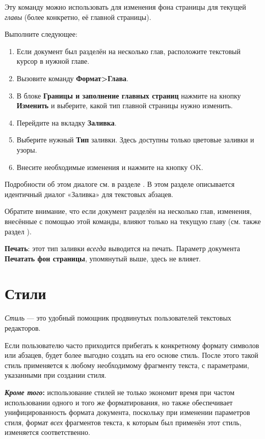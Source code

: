 ﻿\documentclass[a4paper,10pt]{article}
\begin{document}
Эту команду можно использовать для изменения фона страницы для текущей \textit{главы} (более конкретно, её главной страницы).

Выполните следующее:
\begin{enumerate}
 \item Если документ был разделён на несколько глав, расположите текстовый курсор в нужной главе.
 \item Вызовите команду \textbf{Формат>Глава}.
 \item В блоке \textbf{Границы и заполнение главных страниц} нажмите на кнопку \textbf{Изменить} и выберите, какой тип главной страницы нужно изменить.
 \item Перейдите на вкладку \textbf{Заливка}.
 \item Выберите нужный \textbf{Тип} заливки. Здесь доступны только цветовые заливки и узоры.
 \item Внесите необходимые изменения и нажмите на кнопку OK.
\end{enumerate}

Подробности об этом диалоге см. в разделе . В этом разделе описывается идентичный диалог «Заливка» для текстовых абзацев.

Обратите внимание, что если документ разделён на несколько глав, изменения, внесённые с помощью этой команды, влияют только на текущую главу (см. также раздел ).

\textbf{Печать}: этот тип заливки \textit{всегда} выводится на печать. Параметр документа \textbf{Печатать фон страницы}, упомянутый выше, здесь не влияет.

\section{Стили} \label{sec:стили}
\textit{Стиль} — это удобный помощник продвинутых пользователей текстовых редакторов.

Если пользователю часто приходится прибегать к конкретному формату символов или абзацев, будет более выгодно создать на его основе стиль. После этого такой стиль применяется к любому необходимому фрагменту текста, с параметрами, указанными при создании стиля.

\begin{mdframed}[backgroundcolor=blue!10]
\textbf{\textit{Кроме того}:} использование стилей не только экономит время при частом использовании одного и того же форматирования, но также обеспечивает унифицированность формата документа, поскольку при изменении параметров стиля, формат \textit{всех} фрагментов текста, к которым был применён этот стиль, изменяется соответственно.
\end{mdframed}
\end{document}
